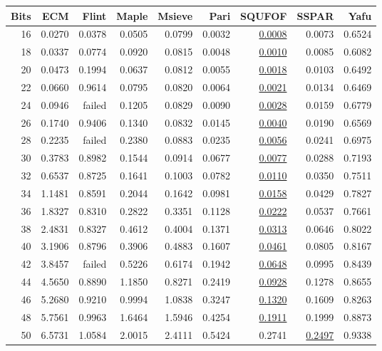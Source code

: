 \documentclass{ucalgthes1}
\theoremstyle{definition}
\begin{document}
\begin{table}[htb]
\centering
\begin{tabular}{| r | r | r | r | r | r | r | r | r |}
	\hline
Bits & ECM & Flint & Maple & Msieve & Pari & SQUFOF & SSPAR & Yafu \\
	\hline
16 & 0.0270 & 0.0378 & 0.0505 & 0.0799 & 0.0032 & \underline{0.0008} & 0.0073 & 0.6524 \\
18 & 0.0337 & 0.0774 & 0.0920 & 0.0815 & 0.0048 & \underline{0.0010} & 0.0085 & 0.6082 \\
20 & 0.0473 & 0.1994 & 0.0637 & 0.0812 & 0.0055 & \underline{0.0018} & 0.0103 & 0.6492 \\
22 & 0.0660 & 0.9614 & 0.0795 & 0.0820 & 0.0064 & \underline{0.0021} & 0.0134 & 0.6469 \\
24 & 0.0946 & failed & 0.1205 & 0.0829 & 0.0090 & \underline{0.0028} & 0.0159 & 0.6779 \\
26 & 0.1740 & 0.9406 & 0.1340 & 0.0832 & 0.0145 & \underline{0.0040} & 0.0190 & 0.6569 \\
28 & 0.2235 & failed & 0.2380 & 0.0883 & 0.0235 & \underline{0.0056} & 0.0241 & 0.6975 \\
30 & 0.3783 & 0.8982 & 0.1544 & 0.0914 & 0.0677 & \underline{0.0077} & 0.0288 & 0.7193 \\
32 & 0.6537 & 0.8725 & 0.1641 & 0.1003 & 0.0782 & \underline{0.0110} & 0.0350 & 0.7511 \\
34 & 1.1481 & 0.8591 & 0.2044 & 0.1642 & 0.0981 & \underline{0.0158} & 0.0429 & 0.7827 \\
36 & 1.8327 & 0.8310 & 0.2822 & 0.3351 & 0.1128 & \underline{0.0222} & 0.0537 & 0.7661 \\
38 & 2.4831 & 0.8327 & 0.4612 & 0.4004 & 0.1371 & \underline{0.0313} & 0.0646 & 0.8022 \\
40 & 3.1906 & 0.8796 & 0.3906 & 0.4883 & 0.1607 & \underline{0.0461} & 0.0805 & 0.8167 \\
42 & 3.8457 & failed & 0.5226 & 0.6174 & 0.1942 & \underline{0.0648} & 0.0995 & 0.8439 \\
44 & 4.5650 & 0.8890 & 1.1850 & 0.8271 & 0.2419 & \underline{0.0928} & 0.1278 & 0.8655 \\
46 & 5.2680 & 0.9210 & 0.9994 & 1.0838 & 0.3247 & \underline{0.1320} & 0.1609 & 0.8263 \\
48 & 5.7561 & 0.9963 & 1.6464 & 1.5946 & 0.4254 & \underline{0.1911} & 0.1999 & 0.8873 \\
50 & 6.5731 & 1.0584 & 2.0015 & 2.4111 & 0.5424 & 0.2741 & \underline{0.2497} & 0.9338 \\

\end{tabular}
\end{table}
\end{document}
